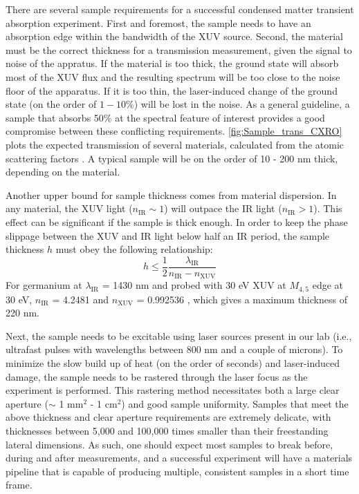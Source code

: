 There are several sample requirements for a successful condensed matter transient absorption experiment. First and foremost, the sample needs to have an absorption edge within the bandwidth of the XUV source. Second, the material must be the correct thickness for a transmission measurement, given the signal to noise of the appratus. If the material is too thick, the ground state will absorb most of the XUV flux and the resulting spectrum will be too close to the noise floor of the apparatus. If it is too thin, the laser-induced change of the ground state (on the order of $1-10\%$) will be lost in the noise. As a general guideline, a sample that absorbs 50\% at the spectral feature of interest provides a good compromise between these conflicting requirements. \cref{fig:Sample_trans_CXRO} plots the expected transmission of several materials, calculated from the atomic scattering factors \cite{gulliksonCXROXRayInteractions}. A typical sample will be on the order of 10 - 200 nm thick, depending on the material.

Another upper bound for sample thickness comes from material dispersion. In any material, the XUV light ($n_{\text{IR}} \sim 1$) will outpace the IR light ($n_{\text{IR}} > 1$). This effect can be significant if the sample is thick enough. In order to keep the phase slippage between the XUV and IR light below half an IR period, the sample thickness $h$ must obey the following relationship:
\begin{equation}
h \le \frac{1}{2} \frac{\lambda_{\text{IR}}}{n_{\text{IR}} - n_{\text{XUV}}}
\end{equation}
For germanium at $\lambda_{\text{IR}}$ = 1430 nm and probed with 30 eV XUV at $M_{4,5}$ edge at 30 eV, $n_{\text{IR}}$ = 4.2481 \cite{nunleyOpticalConstantsGermanium2016} and $n_{\text{XUV}}$ = 0.992536 \cite{gulliksonCXROXRayInteractions}, which gives a maximum thickness of 220 nm.

Next, the sample needs to be excitable using laser sources present in our lab (i.e., ultrafast pulses with wavelengths between 800 nm and a couple of microns). To minimize the slow build up of heat (on the order of seconds) and laser-induced damage, the sample needs to be rastered through the laser focus as the experiment is performed. This rastering method necessitates both a large clear aperture ($\sim$ 1 mm$^2$ - 1 cm$^2$) and good sample uniformity. Samples that meet the above thickness and clear aperture requirements are extremely delicate, with thicknesses between 5,000 and 100,000 times smaller than their freestanding lateral dimensions. As such, one should expect most samples to break before, during and after measurements, and a successful experiment will have a materials pipeline that is capable of producing multiple, consistent samples in a short time frame.

